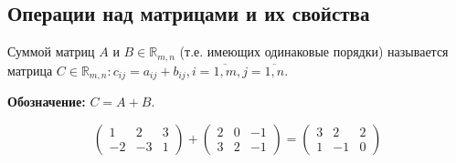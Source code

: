\subsection{Операции над матрицами и их свойства}
\begin{definition}
  Суммой матриц $A$ и $B \in \mathds{R}_{m,n}$ (т.е. имеющих одинаковые порядки) называется матрица $C \in \mathds{R}_{m,n}:c_{ij}=a_{ij}+b_{ij}, i = \overline{1,m}, j = \overline{1,n}$.
\end{definition}
\textbf{Обозначение:} $C = A + B$.

\begin{example}
  \[ \begin{pmatrix}
    1& 2& 3\\
    -2& -3& 1
  \end{pmatrix} + \begin{pmatrix}
    2& 0& -1\\
    3& 2& -1
  \end{pmatrix} = \begin{pmatrix}
    3& 2& 2\\
    1& -1& 0
  \end{pmatrix} \]
\end{example}

\begin{properties}
  \begin{enumerate}

  \end{enumerate}
\end{properties}
